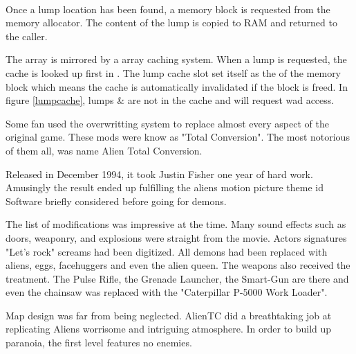 \par
{}\\
\par
Once a lump location has been found, a memory block is requested from the memory allocator. The content of the lump is copied to RAM and returned to the caller. \\
\par
The  array is mirrored by a  array caching system. When a lump is requested, the cache is looked up first in . The lump cache slot set itself as the  of the memory block which means the cache is automatically invalidated if the block is freed. In figure \ref{lumpcache}, lumps  \&  are not in the cache and will request wad access.\\
\par
{}
\par
{}



Some fan used the overwritting system to replace almost every aspect of the original game. These mods were know as "Total Conversion". The most notorious of them all, was name Alien Total Conversion.\\
\par
Released in December 1994, it took Justin Fisher one year of hard work. Amusingly the result ended up fulfilling the aliens motion picture theme id Software briefly considered before going for demons.\\
\par
 \par
 The list of modifications was impressive at the time. Many sound effects such as doors, weaponry, and explosions were straight from the movie. Actors signatures "Let's rock" screams had been digitized. All demons had been replaced with aliens, eggs, facehuggers and even the alien queen.
The weapons also received the treatment. The Pulse Rifle, the Grenade Launcher, the Smart-Gun are there and even the chainsaw was replaced with the "Caterpillar P-5000 Work Loader".\\
\par
Map design was far from being neglected. AlienTC did a breathtaking job at replicating Aliens worrisome and intriguing atmosphere. In order to build up paranoia, the first level features no enemies.
